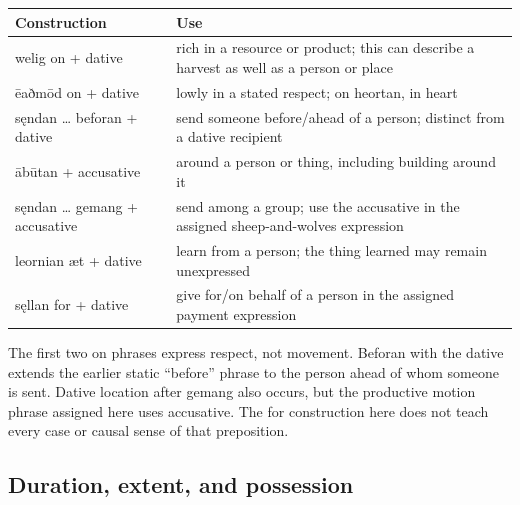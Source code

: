 \par\begingroup
\fontsize{10.5}{13.2}\selectfont
\setlength{\LTleft}{0pt}\setlength{\LTright}{\fill}
\noindent
\begin{tabular}{@{}>{\raggedright\arraybackslash}p{34.65mm}>{\raggedright\arraybackslash}p{86.54mm}@{}}
\toprule
\textbf{Construction} & \textbf{Use} \\
\midrule
welig on + dative & rich in a resource or product; this can describe a harvest as well as a person or place \\
ēaðmōd on + dative & lowly in a stated respect; on heortan, in heart \\
sęndan … beforan + dative & send someone before/\allowbreak{}ahead of a person; distinct from a dative recipient \\
ābūtan + accusative & around a person or thing, including building around it \\
sęndan … gemang + accusative & send among a group; use the accusative in the assigned sheep-and-wolves expression \\
leornian æt + dative & learn from a person; the thing learned may remain unexpressed \\
sęllan for + dative & give for/\allowbreak{}on behalf of a person in the assigned payment expression \\
\bottomrule
\end{tabular}
\par\endgroup

The first two on phrases express respect, not movement. Beforan with the dative extends the earlier static “before” phrase to the person ahead of whom someone is sent. Dative location after gemang also occurs, but the productive motion phrase assigned here uses accusative. The for construction here does not teach every case or causal sense of that preposition.

\subsection*{Duration, extent, and possession}

